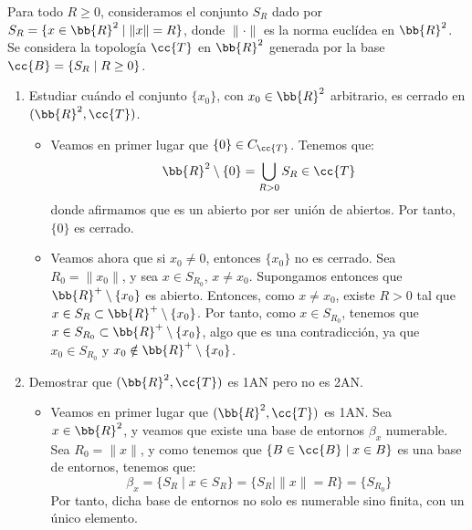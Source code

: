 \documentclass[12pt]{article}
\newcommand{\T}[0]{\cc{T}}
\begin{document}
    \begin{ejercicio}[4.5 puntos]
        Para todo $R\geq 0$, consideramos el conjunto $S_R$ dado por $S_R= \{x\in \bb{R}^2\mid \|x\|= R\}$, donde $\|\cdot\|$ es la norma euclídea en $\bb{R}^2$.
        Se considera la topología $\T$ en $\bb{R}^2$ generada por la base $\cc{B}= \{S_R\mid R\geq 0\}$.
        \begin{enumerate}
            \item Estudiar cuándo el conjunto $\{x_0\}$, con $x_0\in \bb{R}^2$ arbitrario,
            es cerrado en $(\bb{R}^2,\T)$.

            \begin{itemize}
                \item Veamos en primer lugar que $\{0\}\in C_{\T}$. Tenemos que:
                \begin{equation*}
                    \bb{R}^2 \setminus \{0\} = \bigcup_{R>0} S_R \in \T
                \end{equation*}
                donde afirmamos que es un abierto por ser unión de abiertos. Por tanto, $\{0\}$ es cerrado.

                \item Veamos ahora que si $x_0\neq 0$, entonces $\{x_0\}$ no es cerrado.
                Sea $R_0=\|x_0\|$, y sea $x\in S_{R_0}$, $x\neq x_0$.
                Supongamos entonces que $\bb{R}^+\setminus \{x_0\}$ es abierto. Entonces,
                como $x\neq x_0$, existe $R>0$ tal que $x\in S_R\subset \bb{R}^+\setminus \{x_0\}$.
                Por tanto, como $x\in S_{R_0}$, tenemos que $x\in S_{R_0}\subset \bb{R}^+\setminus \{x_0\}$,
                algo que es una contradicción, ya que $x_0\in S_{R_0}$ y $x_0\notin \bb{R}^+\setminus \{x_0\}$.
            \end{itemize}


            \item Demostrar que $(\bb{R}^2,\T)$ es 1AN pero no es 2AN.
            
            \begin{itemize}
                \item Veamos en primer lugar que $(\bb{R}^2,\T)$ es 1AN. Sea $x\in \bb{R}^2$, y veamos que existe una base de entornos $\beta_x$ numerable.
                Sea $R_0=\|x\|$, y como tenemos que $\{B\in \cc{B}\mid x\in B\}$ es una base de entornos,
                tenemos que:
                \begin{equation*}
                    \beta_x = \{S_R\mid x\in S_R\} = \{S_R\mid \|x\|=R\} = \{S_{R_0}\}
                \end{equation*}
                Por tanto, dicha base de entornos no solo es numerable sino finita, con un único elemento.


\end{itemize}
\end{enumerate}
\end{ejercicio}
\end{document}
